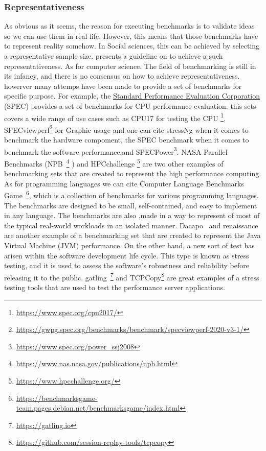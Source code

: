 \subsubsection{Representativeness}
As obvious as it seems, the reason for executing benchmarks is to validate ideas so we can use them in real life.
However, this means that those benchmarks have to represent reality somehow. In Social sciences, this can be achieved by selecting a representative sample size. \citeauthor{omair2014sample} presents a guideline on to achieve a such representativeness.
As for computer science. The field of benchmarking is still in its infancy, and there is no consensus on how to achieve representativeness. howerver many attemps have been made to provide a set of benchmarks for specific purpose.
For example, the \href{https://www.spec.org/}{Standard Performance Evaluation Corporation} (SPEC) provides a set of benchmarks for CPU performance evaluation. this sets covers a wide range of use cases such as  CPU17 for testing the CPU \footnote{\url{https://www.spec.org/cpu2017/}}, SPECviewperf\footnote{\url{https://gwpg.spec.org/benchmarks/benchmark/specviewperf-2020-v3-1/}} for Graphic usage and
one can cite stressNg when it comes to benchmark the hardware compoment, the SPEC benchmark when it comes to benchmark the software performance,and SPECPower\footnote{\url{https://www.spec.org/power_ssj2008} }.
NASA Parallel Benchmarks (NPB~\footnote{\url{https://www.nas.nasa.gov/publications/npb.html}} )
and HPCchallenge \footnote{\url{https://www.hpcchallenge.org/}} are two other examples of benchmarking sets that are created to represent the high performance computing.
As for programming languages we can cite Computer Language Benchmarks Game~\footnote{\url{https://benchmarksgame-team.pages.debian.net/benchmarksgame/index.html}}, which is a collection of benchmarks for various programming languages. The benchmarks are designed to be small, self-contained, and easy to implement in any language. The benchmarks are also ,made in a way to represent of most of the typical real-world workloads in an isolated manner.
Dacapo~\cite{blackburn2006dacapo} and renaissance~\cite{renaissance} are another example of a benchmarking set that are created to represent the Java Virtual Machine (JVM) performance.
On the other hand, a new sort of test has arisen within the software development life cycle. This type is known as stress testing, and it is used to assess the software's robustness and reliability before releasing it to the public. gatling~\footnote{\url{https://gatling.io}} and TCPCopy\footnote{\url{https://github.com/session-replay-tools/tcpcopy}} are great  examples of a stress testing tools that are used to test the performance server applications.

